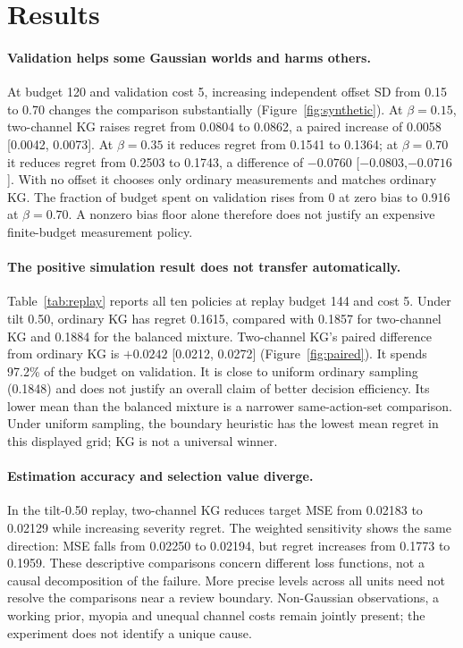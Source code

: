 \section{Results}
\paragraph{Validation helps some Gaussian worlds and harms others.}
At budget 120 and validation cost 5, increasing independent offset SD from 0.15 to 0.70 changes the comparison substantially (Figure~\ref{fig:synthetic}). At $\beta=0.15$, two-channel KG raises regret from 0.0804 to 0.0862, a paired increase of 0.0058 [0.0042, 0.0073]. At $\beta=0.35$ it reduces regret from 0.1541 to 0.1364; at $\beta=0.70$ it reduces regret from 0.2503 to 0.1743, a difference of $-0.0760$ [$-0.0803$,$-0.0716$]. With no offset it chooses only ordinary measurements and matches ordinary KG. The fraction of budget spent on validation rises from 0 at zero bias to 0.916 at $\beta=0.70$. A nonzero bias floor alone therefore does not justify an expensive finite-budget measurement policy.



\paragraph{The positive simulation result does not transfer automatically.}
Table~\ref{tab:replay} reports all ten policies at replay budget 144 and cost 5. Under tilt 0.50, ordinary KG has regret 0.1615, compared with 0.1857 for two-channel KG and 0.1884 for the balanced mixture. Two-channel KG's paired difference from ordinary KG is $+0.0242$ [0.0212, 0.0272] (Figure~\ref{fig:paired}). It spends 97.2\% of the budget on validation. It is close to uniform ordinary sampling (0.1848) and does not justify an overall claim of better decision efficiency. Its lower mean than the balanced mixture is a narrower same-action-set comparison. Under uniform sampling, the boundary heuristic has the lowest mean regret in this displayed grid; KG is not a universal winner.





\paragraph{Estimation accuracy and selection value diverge.}
In the tilt-0.50 replay, two-channel KG reduces target MSE from 0.02183 to 0.02129 while increasing severity regret. The weighted sensitivity shows the same direction: MSE falls from 0.02250 to 0.02194, but regret increases from 0.1773 to 0.1959. These descriptive comparisons concern different loss functions, not a causal decomposition of the failure. More precise levels across all units need not resolve the comparisons near a review boundary. Non-Gaussian observations, a working prior, myopia and unequal channel costs remain jointly present; the experiment does not identify a unique cause.

